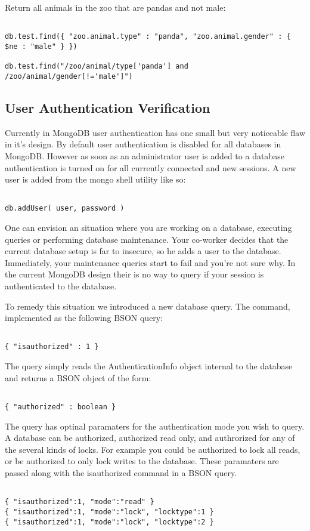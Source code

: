 \documentclass{../dependencies/acm_proc_article-sp}
\begin{document}
Return all animals in the zoo that are pandas and not male:
\begin{lstlisting}

db.test.find({ "zoo.animal.type" : "panda", "zoo.animal.gender" : { $ne : "male" } })

db.test.find("/zoo/animal/type['panda'] and /zoo/animal/gender[!='male']")
\end{lstlisting}

\subsection{User Authentication Verification}
Currently in MongoDB user authentication has one small but very noticeable flaw in it's design.
By default user authentication is disabled for all databases in MongoDB. However as soon as an administrator
user is added to a database authentication is turned on for all currently connected and new sessions.
A new user is added from the mongo shell utility like so:
\begin{lstlisting}

db.addUser( user, password )
\end{lstlisting}

One can envision an situation where you are working on a database, executing queries
or performing database maintenance. Your co-worker decides that the current database setup
is far to insecure, so he adds a user to the database. Immediately, your maintenance queries
start to fail and you're not sure why. In the current MongoDB design their is no way
to query if your session is authenticated to the database.

To remedy this situation we introduced a new database query.
The command, implemented as the following BSON query:
\begin{lstlisting}

{ "isauthorized" : 1 }
\end{lstlisting}

The query simply reads the AuthenticationInfo object internal to the database
and returns a BSON object of the form:
\begin{lstlisting}

{ "authorized" : boolean }
\end{lstlisting}

The query has optinal paramaters for the authentication mode you wish to query.
A database can be authorized, authorized read only, and authrorized for any
of the several kinds of locks. For example you could be authorized to lock all
reads, or be authorized to only lock writes to the database.
These paramaters are passed along with the isauthorized command in a BSON query.
\begin{lstlisting}

{ "isauthorized":1, "mode":"read" }
{ "isauthorized":1, "mode":"lock", "locktype":1 }
{ "isauthorized":1, "mode":"lock", "locktype":2 }
\end{lstlisting}
\end{document}
